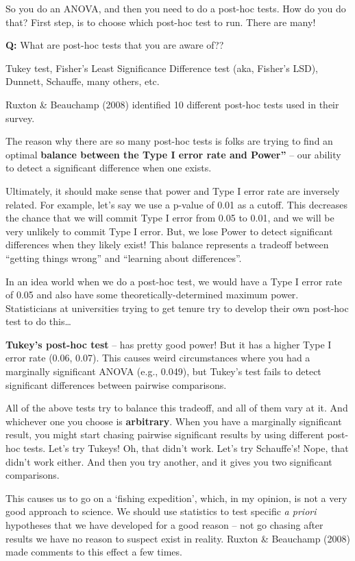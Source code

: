 \documentclass[
]{article}
\begin{document}
So you do an ANOVA, and then you need to do a post-hoc tests. How do you
do that? First step, is to choose which post-hoc test to run. There are
many!

\textbf{Q:} What are post-hoc tests that you are aware of??

Tukey test, Fisher's Least Significance Difference test (aka, Fisher's
LSD), Dunnett, Schauffe, many others, etc.

Ruxton \& Beauchamp (2008) identified 10 different post-hoc tests used
in their survey.

The reason why there are so many post-hoc tests is folks are trying to
find an optimal \textbf{balance between the Type I error rate and
Power''} -- our ability to detect a significant difference when one
exists.

Ultimately, it should make sense that power and Type I error rate are
inversely related. For example, let's say we use a p-value of 0.01 as a
cutoff. This decreases the chance that we will commit Type I error from
0.05 to 0.01, and we will be very unlikely to commit Type I error. But,
we lose Power to detect significant differences when they likely exist!
This balance represents a tradeoff between ``getting things wrong'' and
``learning about differences''.

In an idea world when we do a post-hoc test, we would have a Type I
error rate of 0.05 and also have some theoretically-determined maximum
power. Statisticians at universities trying to get tenure try to develop
their own post-hoc test to do this\ldots{}

\textbf{Tukey's post-hoc test} -- has pretty good power! But it has a
higher Type I error rate (0.06, 0.07). This causes weird circumstances
where you had a marginally significant ANOVA (e.g., 0.049), but Tukey's
test fails to detect significant differences between pairwise
comparisons.

All of the above tests try to balance this tradeoff, and all of them
vary at it. And whichever one you choose is \textbf{arbitrary}. When you
have a marginally significant result, you might start chasing pairwise
significant results by using different post-hoc tests. Let's try Tukeys!
Oh, that didn't work. Let's try Schauffe's! Nope, that didn't work
either. And then you try another, and it gives you two significant
comparisons.

This causes us to go on a `fishing expedition', which, in my opinion, is
not a very good approach to science. We should use statistics to test
specific \emph{a priori} hypotheses that we have developed for a good
reason -- not go chasing after results we have no reason to suspect
exist in reality. Ruxton \& Beauchamp (2008) made comments to this
effect a few times.
\end{document}
